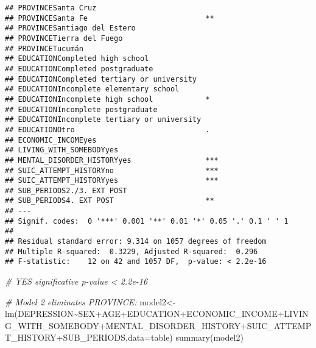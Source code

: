\documentclass[
]{book}
\newenvironment{Shaded}{\begin{snugshade}}{\end{snugshade}}
\newcommand{\AttributeTok}[1]{\textcolor[rgb]{0.77,0.63,0.00}{#1}}
\newcommand{\CommentTok}[1]{\textcolor[rgb]{0.56,0.35,0.01}{\textit{#1}}}
\newcommand{\FunctionTok}[1]{\textcolor[rgb]{0.00,0.00,0.00}{#1}}
\newcommand{\NormalTok}[1]{#1}
\newcommand{\OtherTok}[1]{\textcolor[rgb]{0.56,0.35,0.01}{#1}}
\newcommand{\SpecialCharTok}[1]{\textcolor[rgb]{0.00,0.00,0.00}{#1}}
\begin{document}
\begin{verbatim}
## PROVINCESanta Cruz                            
## PROVINCESanta Fe                           ** 
## PROVINCESantiago del Estero                   
## PROVINCETierra del Fuego                      
## PROVINCETucumán                               
## EDUCATIONCompleted high school                
## EDUCATIONCompleted postgraduate               
## EDUCATIONCompleted tertiary or university     
## EDUCATIONIncomplete elementary school         
## EDUCATIONIncomplete high school            *  
## EDUCATIONIncomplete postgraduate              
## EDUCATIONIncomplete tertiary or university    
## EDUCATIONOtro                              .  
## ECONOMIC_INCOMEyes                            
## LIVING_WITH_SOMEBODYyes                       
## MENTAL_DISORDER_HISTORYyes                 ***
## SUIC_ATTEMPT_HISTORYno                     ***
## SUIC_ATTEMPT_HISTORYyes                    ***
## SUB_PERIODS2./3. EXT POST                     
## SUB_PERIODS4. EXT POST                     ** 
## ---
## Signif. codes:  0 '***' 0.001 '**' 0.01 '*' 0.05 '.' 0.1 ' ' 1
## 
## Residual standard error: 9.314 on 1057 degrees of freedom
## Multiple R-squared:  0.3229, Adjusted R-squared:  0.296 
## F-statistic:    12 on 42 and 1057 DF,  p-value: < 2.2e-16
\end{verbatim}

\begin{Shaded}
\begin{Highlighting}[]
\CommentTok{\# YES significative p{-}value \textless{} 2.2e{-}16}

\CommentTok{\# Model 2 eliminates PROVINCE:}
\NormalTok{model2}\OtherTok{\textless{}{-}}\FunctionTok{lm}\NormalTok{(DEPRESSION}\SpecialCharTok{\textasciitilde{}}\NormalTok{SEX}\SpecialCharTok{+}\NormalTok{AGE}\SpecialCharTok{+}\NormalTok{EDUCATION}\SpecialCharTok{+}\NormalTok{ECONOMIC\_INCOME}\SpecialCharTok{+}\NormalTok{LIVING\_WITH\_SOMEBODY}\SpecialCharTok{+}\NormalTok{MENTAL\_DISORDER\_HISTORY}\SpecialCharTok{+}\NormalTok{SUIC\_ATTEMPT\_HISTORY}\SpecialCharTok{+}\NormalTok{SUB\_PERIODS,}\AttributeTok{data=}\NormalTok{table)}
\FunctionTok{summary}\NormalTok{(model2)}
\end{Highlighting}
\end{Shaded}
\end{document}
